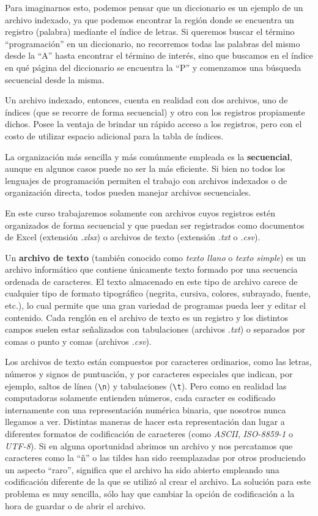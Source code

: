 \documentclass[
]{book}
\begin{document}
\begin{itemize}
  Para imaginarnos esto, podemos pensar que un diccionario es un ejemplo de un archivo indexado, ya que podemos encontrar la región donde se encuentra un registro (palabra) mediante el índice de letras. Si queremos buscar el término ``programación'' en un diccionario, no recorremos todas las palabras del mismo desde la ``A'' hasta encontrar el término de interés, sino que buscamos en el índice en qué página del diccionario se encuentra la ``P'' y comenzamos una búsqueda secuencial desde la misma.

  Un archivo indexado, entonces, cuenta en realidad con dos archivos, uno de índices (que se recorre de forma secuencial) y otro con los registros propiamente dichos. Posee la ventaja de brindar un rápido acceso a los registros, pero con el costo de utilizar espacio adicional para la tabla de índices.
\end{itemize}

La organización más sencilla y más comúnmente empleada es la \textbf{secuencial}, aunque en algunos casos puede no ser la más eficiente. Si bien no todos los lenguajes de programación permiten el trabajo con archivos indexados o de organización directa, todos pueden manejar archivos secuenciales.

En este curso trabajaremos solamente con archivos cuyos registros estén organizados de forma secuencial y que puedan ser registrados como documentos de Excel (extensión \emph{.xlsx}) o archivos de texto (extensión \emph{.txt} o \emph{.csv}).

Un \textbf{archivo de texto} (también conocido como \emph{texto llano} o \emph{texto simple}) es un archivo informático que contiene únicamente texto formado por una secuencia ordenada de caracteres. El texto almacenado en este tipo de archivo carece de cualquier tipo de formato tipográfico (negrita, cursiva, colores, subrayado, fuente, etc.), lo cual permite que una gran variedad de programas pueda leer y editar el contenido. Cada renglón en el archivo de texto es un registro y los distintos campos suelen estar señalizados con tabulaciones (archivos \emph{.txt}) o separados por comas o punto y comas (archivos \emph{.csv}).

Los archivos de texto están compuestos por caracteres ordinarios, como las letras, números y signos de puntuación, y por caracteres especiales que indican, por ejemplo, saltos de línea (\texttt{\textbackslash{}n}) y tabulaciones (\texttt{\textbackslash{}t}). Pero como en realidad las computadoras solamente entienden números, cada caracter es codificado internamente con una representación numérica binaria, que nosotros nunca llegamos a ver. Distintas maneras de hacer esta representación dan lugar a diferentes formatos de codificación de caracteres (como \emph{ASCII}, \emph{ISO-8859-1} o \emph{UTF-8}). Si en alguna oportunidad abrimos un archivo y nos percatamos que caracteres como la ``ñ'' o las tildes han sido reemplazadas por otros produciendo un aspecto ``raro'', significa que el archivo ha sido abierto empleando una codificación diferente de la que se utilizó al crear el archivo. La solución para este problema es muy sencilla, sólo hay que cambiar la opción de codificación a la hora de guardar o de abrir el archivo.
\end{document}
